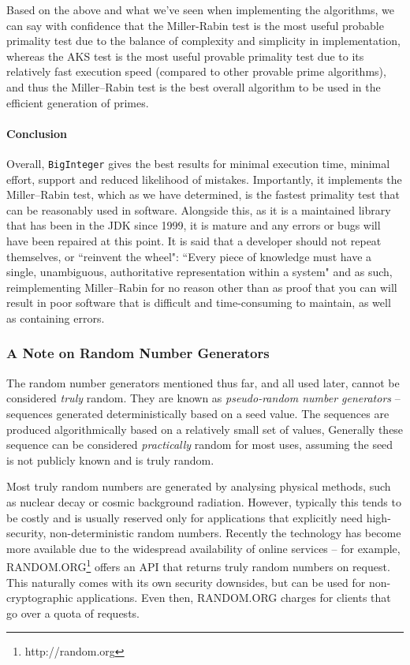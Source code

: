     Based on the above and what we've seen when implementing the algorithms, we can say with confidence that the Miller-Rabin test is the most useful probable primality test due to the balance of complexity  and simplicity in implementation, whereas the AKS test is the most useful provable primality test due to its relatively fast execution speed (compared to other provable prime algorithms), and thus the Miller--Rabin test is the best overall algorithm to be used in the efficient generation of primes.
    
      \paragraph{Conclusion}
      
      Overall, \verb!BigInteger! gives the best results for minimal execution time, minimal effort, support and reduced likelihood of mistakes. Importantly, it implements the Miller--Rabin test, which as we have determined, is the fastest primality test that can be reasonably used in software. Alongside this, as it is a maintained library that has been in the JDK since 1999, it is mature and any errors or bugs will have been repaired at this point. It is said that a developer should not repeat themselves, or ``reinvent the wheel": ``Every piece of knowledge must have a single, unambiguous, authoritative representation within a system"\cite{Hunt:1999aa} and as such, reimplementing Miller--Rabin for no reason other than as proof that you can will result in poor software that is difficult and time-consuming to maintain, as well as containing errors.
    
    \subsubsection{A Note on Random Number Generators}
    
    The random number generators mentioned thus far, and all used later, cannot be considered \emph{truly} random. They are known as \emph{pseudo-random number generators} -- sequences generated deterministically based on a seed value. The sequences are produced algorithmically based on a relatively small set of values, Generally these sequence can be considered \emph{practically} random for most uses, assuming the seed is not publicly known and is truly random.
    
    Most truly random numbers are generated by analysing physical methods, such as nuclear decay or cosmic background radiation. However, typically this tends to be costly and is usually reserved only for applications that explicitly need high-security, non-deterministic random numbers. Recently the technology has become more available due to the widespread availability of online services -- for example, RANDOM.ORG\footnote{http://random.org} offers an API that returns truly random numbers on request. This naturally comes with its own security downsides, but can be used for non-cryptographic applications. Even then, RANDOM.ORG charges for clients that go over a quota of requests.
    
